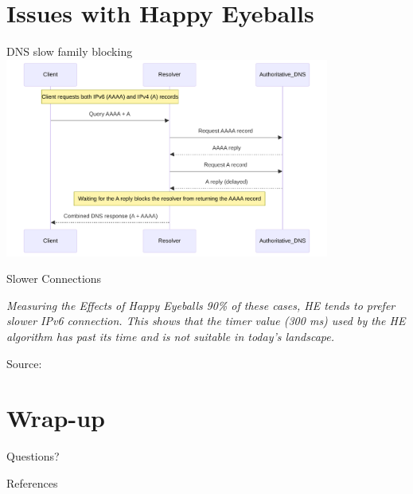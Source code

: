 \documentclass[aspectratio=169]{beamer}
\begin{document}
\section{Issues with Happy Eyeballs}
\begin{frame}{DNS slow family blocking}
  \centering
  \includegraphics[width=0.8\textwidth]{sfblocking.pdf}
\end{frame}

\begin{frame}{Slower Connections}
\begin{block}{\textit{Measuring the Effects of Happy Eyeballs}}
\vspace{0.5em}
\textit{90\% of these cases, HE
tends to prefer slower IPv6 connection. This shows that the timer
value (300 ms) used by the HE algorithm has past its time and is
not suitable in today’s landscape.}
\end{block}
  \centering
  {\tiny Source: \parencite{bajpaiMeasuringEffectsHappy2016}}
\end{frame}

\section{Wrap-up}
\begin{frame}
  \centering
  \vfill
  {\LARGE Questions?}
  \vfill
\end{frame}

\begin{frame}[allowframebreaks]{References}
  \printbibliography
\end{frame}
\end{document}
